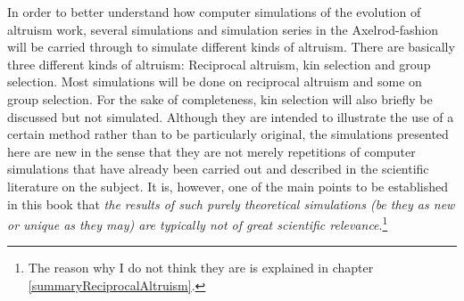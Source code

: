 In order to better understand how computer simulations of the evolution of
altruism work, several simulations and simulation series in the Axelrod-fashion
will be carried through to simulate different kinds of altruism. There are
basically three different kinds of altruism: Reciprocal altruism, kin
selection and group selection. Most simulations will be done on reciprocal
altruism and some on group selection. For the sake of completeness, kin
selection will also briefly be discussed but not simulated. Although they are intended to illustrate the use of a certain method rather than to be particularly original,
the simulations presented here are new in the sense that they are not merely repetitions of
computer simulations that have already been carried out and described in the
scientific literature on the subject. It is, however, one 
of the main points to be established in this book that {\em the results of such purely theoretical simulations (be they as new or unique as they may) are typically not of
  great scientific relevance}.\footnote{The reason why I do not think they are
  is explained in chapter \ref{summaryReciprocalAltruism}.}

